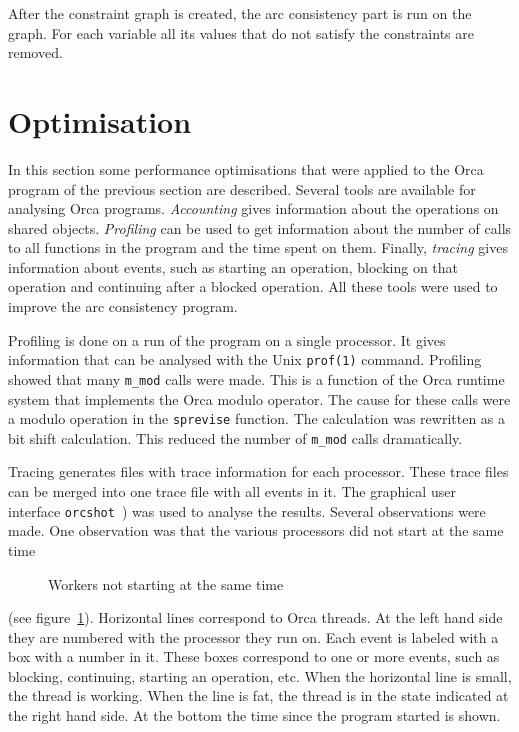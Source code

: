 \documentclass[a4paper,11pt]{article}
\begin{document}
After the constraint graph is created, the arc consistency part is run
on the graph. For each variable all its values that do not satisfy the
constraints are removed.

\section{Optimisation}
\label{sec:tuning}
In this section some performance optimisations that were applied to the
Orca program of the previous section are described.
Several tools are available for analysing Orca programs. {\em Accounting} gives
information about the operations on shared objects. {\em Profiling} can be used
to get information about the number of calls to all functions
in the program and the time spent on them. Finally, {\em tracing}
gives information
about events, such as starting an operation, blocking on that operation
and continuing after a blocked operation.
All these tools were used to improve the arc consistency program.

Profiling is done on a run of the program on a single processor.
It gives
information that can be analysed with the Unix {\tt prof(1)}
command.
Profiling showed that many {\tt m\_mod} calls were made.
This is a function
of the Orca runtime system that implements the Orca modulo operator.
The cause for these calls were a modulo operation in the {\tt sprevise}
function. The calculation was rewritten as a bit shift calculation. This
reduced the number of {\tt m\_mod} calls dramatically.

Tracing generates files with trace information for each processor.
These trace files can be merged into one trace file
with all events in it. The graphical user interface
{\tt orcshot}~\cite{a:orcshot}) was used to analyse the results.
Several observations were made.
One observation was that the various processors did not start at the
same time
\begin{figure}[htbp]
\begin{center}
\caption{Workers not starting at the same time}
\label{fig:start}
\end{center}
\end{figure}
(see figure~\ref{fig:start}). Horizontal lines correspond to Orca threads.
At the left hand side they are numbered with the processor they run on.
Each event is labeled with a box with a number in it. These boxes correspond
to one or more events, such as blocking, continuing, starting an operation,
etc. When the horizontal line is small, the thread is working. When 
the line is
fat, the thread
is in the state indicated at the right hand side. At the bottom the
time since the program started is shown.
\end{document}
